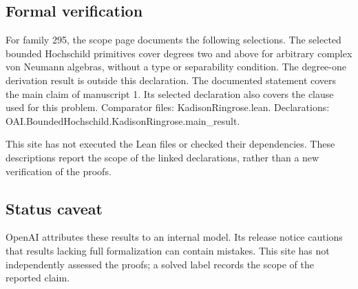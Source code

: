 \documentclass[11pt]{article}
\begin{document}
\subsection{Formal verification}
For family 295, the scope page documents the following selections. The selected bounded Hochschild primitives cover degrees two and above for arbitrary complex von Neumann algebras, without a type or separability condition. The degree-one derivation result is outside this declaration. The documented statement covers the main claim of manuscript 1. Its selected declaration also covers the clause used for this problem. Comparator files: KadisonRingrose.lean. Declarations: OAI.BoundedHochschild.KadisonRingrose.main\_result.

This site has not executed the Lean files or checked their dependencies. These descriptions report the scope of the linked declarations, rather than a new verification of the proofs.

\subsection{Status caveat}
OpenAI attributes these results to an internal model. Its release notice cautions that results lacking full formalization can contain mistakes. This site has not independently assessed the proofs; a solved label records the scope of the reported claim.
\end{document}

